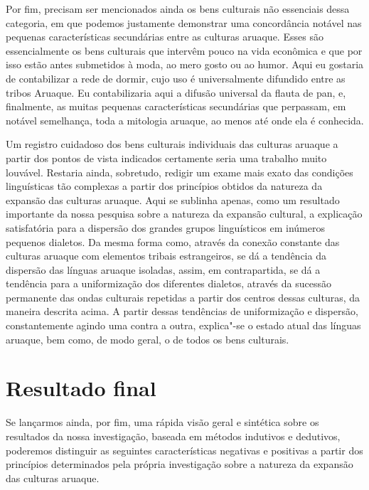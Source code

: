 Por fim, precisam ser mencionados ainda os bens culturais não essenciais
dessa categoria, em que podemos justamente demonstrar uma concordância
notável nas pequenas características secundárias entre as culturas
aruaque. Esses são essencialmente os bens culturais que intervêm pouco
na vida econômica e que por isso estão antes submetidos à moda, ao mero
gosto ou ao humor. Aqui eu gostaria de contabilizar a rede de dormir,
cujo uso é universalmente difundido entre as tribos Aruaque. Eu
contabilizaria aqui a difusão universal da flauta de pan, e, finalmente,
as muitas pequenas características secundárias que perpassam, em notável
semelhança, toda a mitologia aruaque, ao menos até onde ela é conhecida.

Um registro cuidadoso dos bens culturais individuais das culturas
aruaque a partir dos pontos de vista indicados certamente seria uma
trabalho muito louvável. Restaria ainda, sobretudo, redigir um exame
mais exato das condições linguísticas tão complexas a partir dos
princípios obtidos da natureza da expansão das culturas aruaque. Aqui se
sublinha apenas, como um resultado importante da nossa pesquisa sobre a
natureza da expansão cultural, a explicação satisfatória para a
dispersão dos grandes grupos linguísticos em inúmeros pequenos dialetos.
Da mesma forma como, através da conexão constante das culturas aruaque
com elementos tribais estrangeiros, se dá a tendência da dispersão das
línguas aruaque isoladas, assim, em contrapartida, se dá a tendência
para a uniformização dos diferentes dialetos, através da sucessão
permanente das ondas culturais repetidas a partir dos centros dessas
culturas, da maneira descrita acima. A partir dessas tendências de
uniformização e dispersão, constantemente agindo uma contra a outra,
explica"-se o estado atual das línguas aruaque, bem como, de modo geral,
o de todos os bens culturais.

\chapter{Resultado final}

Se lançarmos ainda, por fim, uma rápida visão geral e sintética sobre os
resultados da nossa investigação, baseada em métodos indutivos e dedutivos, 
poderemos distinguir as seguintes características negativas e positivas a partir dos princípios
determinados pela própria investigação sobre a natureza da expansão das
culturas aruaque.

